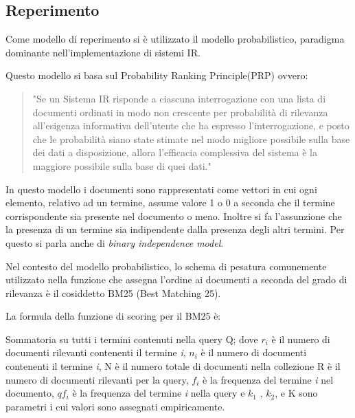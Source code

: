 \documentclass[runningheads]{llncs}
\begin{document}
\subsection{Reperimento}
Come modello di reperimento si \`e utilizzato il modello probabilistico, paradigma dominante nell'implementazione di sistemi IR.

Questo modello si basa sul Probability Ranking Principle(PRP)\cite{PRP} ovvero:

\blockquote{"Se un Sistema IR risponde a ciascuna interrogazione con una lista di documenti ordinati in
modo non crescente per probabilit\`a di rilevanza all'esigenza informativa dell'utente che ha espresso l'interrogazione,
e posto che le probabilit\`a siano state stimate nel modo migliore possibile sulla base dei dati a disposizione, allora
l'efficacia complessiva del sistema \`e la maggiore possibile sulla base di quei dati."}

In questo modello i documenti sono rappresentati come vettori in cui ogni elemento, relativo ad un termine, assume valore 1 o 0 
a seconda che il termine corrispondente sia presente nel documento o meno.
Inoltre si fa l'assunzione che la presenza di un termine sia indipendente dalla presenza degli altri termini.
Per questo si parla anche di \emph{binary independence model}.

Nel contesto del modello probabilistico, lo schema di pesatura comunemente utilizzato nella funzione che assegna l'ordine ai documenti a seconda del grado di rilevanza \`e il cosiddetto BM25\cite{WBC} (Best Matching 25).

\vspace{1in}

La formula della funzione di scoring per il BM25 \`e:

\begin{figure}
  \centering
  \end{figure}

Sommatoria su tutti i termini contenuti nella query Q; dove $r_{i}$ \`e il numero di documenti rilevanti contenenti il termine \emph{i}, $n_{i}$ \`e il numero di documenti contenenti il termine \emph{i}, N \`e il numero totale di documenti nella collezione R \`e il numero di documenti rilevanti per la query, $f_{i}$ \`e la frequenza del termine \emph{i} nel documento, $qf_{i}$ \`e la frequenza del termine \emph{i} nella query e $k_{1}$ , $k_{2}$, e K sono parametri i cui valori sono assegnati empiricamente.
\end{document}
